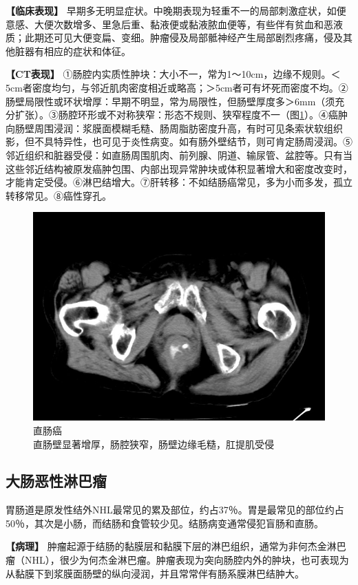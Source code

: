 \textbf{【临床表现】}
早期多无明显症状。中晚期表现为轻重不一的局部刺激症状，如便意感、大便次数增多、里急后重、黏液便或黏液脓血便等，有些伴有贫血和恶液质；此期还可见大便变扁、变细。肿瘤侵及局部骶神经产生局部剧烈疼痛，侵及其他脏器有相应的症状和体征。

\textbf{【CT表现】}
①肠腔内实质性肿块：大小不一，常为1～10cm，边缘不规则。＜5cm者密度均匀，与邻近肌肉密度相近或略高；＞5cm者可有坏死而密度不均。②肠壁局限性或环状增厚：早期不明显，常为局限性，但肠壁厚度多＞6mm（须充分扩张）。③肠腔环形或不对称狭窄：形态不规则、狭窄程度不一（图\ref{fig17-14}）。④癌肿向肠壁周围浸润：浆膜面模糊毛糙、肠周脂肪密度升高，有时可见条索状软组织影，但不具特异性，也可见于炎性病变。如有肠外壁结节，则可肯定肠周浸润。⑤邻近组织和脏器受侵：如直肠周围肌肉、前列腺、阴道、输尿管、盆腔等。只有当这些邻近结构被原发癌肿包围、内部出现异常肿块或体积显著增大和密度改变时，才能肯定受侵。⑥淋巴结增大。⑦肝转移：不如结肠癌常见，多为小而多发，孤立转移常见。⑧癌性穿孔。

\begin{figure}[!htbp]
 \centering
 \includegraphics[width=.7\textwidth,height=\textheight,keepaspectratio]{./images/Image00366.jpg}
 \captionsetup{justification=centering}
 \caption{直肠癌\\{\small 直肠壁显著增厚，肠腔狭窄，肠壁边缘毛糙，肛提肌受侵}}
 \label{fig17-14}
  \end{figure} 

\subsection{大肠恶性淋巴瘤}

胃肠道是原发性结外NHL最常见的累及部位，约占37％。胃是最常见的部位约占50％，其次是小肠，而结肠和食管较少见。结肠病变通常侵犯盲肠和直肠。

\textbf{【病理】}
肿瘤起源于结肠的黏膜层和黏膜下层的淋巴组织，通常为非何杰金淋巴瘤（NHL），很少为何杰金淋巴瘤。肿瘤表现为突向肠腔内外的肿块，也可表现为从黏膜下到浆膜面肠壁的纵向浸润，并且常常伴有肠系膜淋巴结肿大。

